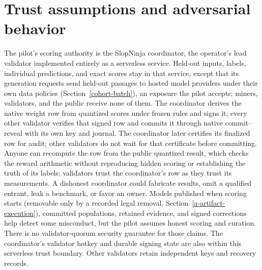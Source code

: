 \section{Trust assumptions and adversarial
behavior}\label{trust-assumptions-and-adversarial-behavior}

The pilot's scoring authority is the SlopNinja coordinator, the operator's
lead validator implemented entirely as a serverless service. Held-out inputs,
labels, individual predictions, and exact scores stay in that service, except
that its generation requests send held-out passages to hosted model providers
under their own data policies (Section~\ref{cohort-batch}), an exposure the pilot
accepts; miners, validators, and the public receive none of them. The
coordinator derives the native weight row from quantized scores under frozen
rules and signs it; every other validator verifies that signed row and commits
it through native commit--reveal with its own key and journal.
The coordinator later certifies its finalized row for audit;
other validators do not wait for that certificate before committing. Anyone can
recompute the row from the public quantized result, which checks the reward
arithmetic without reproducing hidden scoring or establishing the truth of its
labels; validators trust the coordinator's row as they trust its measurements.
A dishonest coordinator
could fabricate results, omit a qualified entrant, leak a benchmark, or favor an owner.
Models published when scoring starts (removable only by a recorded legal
removal, Section~\ref{a-artifact-execution}), committed populations, retained evidence,
and signed corrections help detect some misconduct, but the pilot assumes honest scoring and curation.
There is no validator-quorum security guarantee for those claims.
The coordinator's validator hotkey and durable signing state are also within
this serverless trust boundary. Other validators retain independent keys and
recovery records.


